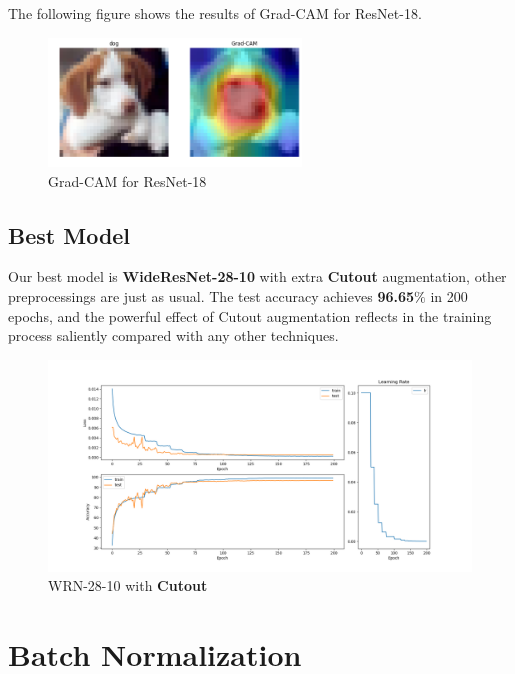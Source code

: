 \documentclass[a4paper, 11pt]{article} %
\begin{document}
The following figure shows the results of Grad-CAM for ResNet-18.

\begin{figure}[H]
	\centering
	\includegraphics[width=0.6\textwidth]{./img/grad-cam.png}
	\caption{Grad-CAM for ResNet-18}
\end{figure}

\subsection{\textbf{Best Model}}

Our best model is \textbf{WideResNet-28-10} with extra \textbf{Cutout} augmentation, other
preprocessings are just as usual. The test accuracy achieves \textbf{96.65$\%$} in 200
epochs, and the powerful effect of Cutout augmentation reflects in the training process
saliently compared with any other techniques.

\begin{figure}[H]
	\centering
	\includegraphics[width=1.0\textwidth]{./img/best.png}
	\caption{WRN-28-10 with \textbf{Cutout}}
\end{figure}

\bigskip


\section{\textbf{Batch Normalization}}
\end{document}
